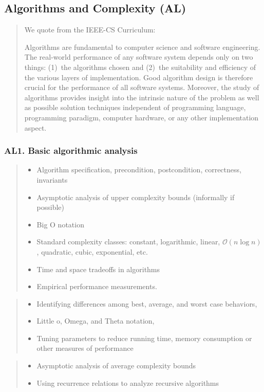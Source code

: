 \documentclass[a4paper,11pt,oneside]{article}
\newcommand{\cmark}{\ding{51}}%
\newcommand{\xmark}{\ding{55}}%
\newcommand{\CC}[1]{#1}
\newcommand{\Cdefine}{{\small\cmark\faFileTextO}}
\newcommand{\Ccodeonly}{{\small\cmark\faFileText}}
\newcommand{\Cnofocus}{{\small\faQuestion}}
\newcommand{\Cexcluded}{{\small\xmark}}
\newcommand{\Idefine}{\item[\hbox to 1.8em{\Cdefine\hfill}]}
\newcommand{\Icodeonly}{\item[\hbox to 1.8em{\Ccodeonly\hfill}]}
\newcommand{\Inofocus}{\item[\hbox to 1.8em{\Cnofocus\hfill}]}
\newcommand{\Iexcluded}{\item[\hbox to 1.8em{\Cexcluded\hfill}]}
\newenvironment{myitemize}{\begin{quote}\begin{itemize}\itemsep 0pt}{\end{itemize}\end{quote}}
\begin{document}

\subsection {Algorithms and Complexity (AL)}
\label{subsubsec:AL}

    \begin{quote}
    We quote from the IEEE-CS Curriculum:

    \sffamily\small
    Algorithms are fundamental to computer science and software engineering.
    The real-world performance of any software system depends only on two things:
    (1)~the algorithms chosen and
    (2)~the suitability and efficiency of the various layers of implementation.
    Good algorithm design is therefore crucial for the performance of all software systems.
    Moreover,
    the study of algorithms provides insight into the intrinsic nature of the problem
    as well as possible solution techniques independent of programming language,
    programming paradigm, computer hardware, or any other implementation aspect.
    \end{quote}

    \subsubsection*{AL1. Basic algorithmic analysis}%

    \begin{myitemize}
    \Idefine Algorithm specification, precondition, postcondition, correctness, invariants
    \Icodeonly\CC{Asymptotic analysis of upper complexity bounds} (informally if possible)
    \Icodeonly\CC{Big O notation}
    \Icodeonly\CC{Standard complexity classes}: constant, logarithmic, linear, $\mathcal{O}(n \log n)$, quadratic, cubic, exponential, etc.
    \Icodeonly\CC{Time and space tradeoffs in algorithms}
    \Icodeonly Empirical performance measurements.
    \end{myitemize}

    \begin{myitemize}
    \Inofocus \CC{Identifying differences among best, average, and worst case behaviors},
    \Inofocus \CC{Little o, Omega, and Theta notation},
    \Inofocus Tuning parameters to reduce running time, memory consumption or other measures of performance
    \end{myitemize}
  
    \begin{myitemize}
    \Iexcluded Asymptotic analysis of average complexity bounds
    \Iexcluded Using recurrence relations to analyze recursive algorithms
    \end{myitemize}
  
\end{document}
